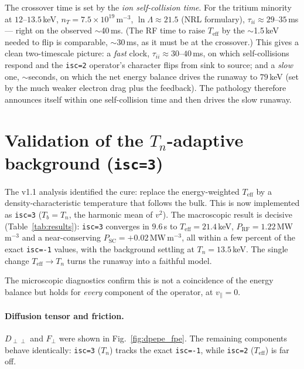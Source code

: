 \documentclass[11pt,a4paper]{article}
\begin{document}
The crossover time is set by the \emph{ion self-collision time}. For the
tritium minority at $12$--$13.5$\,keV, $n_T = 7.5\times10^{19}$\,m$^{-3}$,
$\ln\Lambda\approx21.5$ (NRL formulary),
$\tau_{ii}\approx 29$--$35$\,ms --- right on the observed $\sim$40\,ms. (The RF
time to raise $T_\text{eff}$ by the $\sim$1.5\,keV needed to flip is comparable,
$\sim$30\,ms, as it must be at the crossover.) This gives a clean two-timescale
picture: a \emph{fast} clock, $\tau_{ii}\approx 30$--$40$\,ms, on which
self-collisions respond and the \texttt{isc=2} operator's character flips from
sink to source; and a \emph{slow} one, $\sim$seconds, on which the net energy
balance drives the runaway to $79$\,keV (set by the much weaker electron drag
plus the feedback). The pathology therefore announces itself within one
self-collision time and then drives the slow runaway.

\section{Validation of the \texorpdfstring{$T_n$}{Tn}-adaptive background (\texttt{isc=3})}
\label{sec:tn}

The v1.1 analysis identified the cure: replace the energy-weighted
$T_\text{eff}$ by a density-characteristic temperature that follows the bulk.
This is now implemented as \texttt{isc=3} ($T_b = T_n$, the harmonic mean of
$v^2$). The macroscopic result is decisive (Table~\ref{tab:results}):
\texttt{isc=3} converges in $9.6$\,s to $T_\text{eff} = 21.4$\,keV,
$P_\text{RF} = 1.22$\,MW\,m$^{-3}$ and a near-conserving
$P_\text{SC} = +0.02$\,MW\,m$^{-3}$, all within a few percent of the exact
\texttt{isc=-1} values, with the background settling at $T_n = 13.5$\,keV. The
single change $T_\text{eff}\!\to\!T_n$ turns the runaway into a faithful model.

The microscopic diagnostics confirm this is not a coincidence of the energy
balance but holds for \emph{every} component of the operator, at
$v_\parallel=0$.

\paragraph{Diffusion tensor and friction.}
$D_{\perp\perp}$ and $F_\perp$ were shown in Fig.~\ref{fig:dpepe_fpe}. The
remaining components behave identically: \texttt{isc=3} ($T_n$) tracks the
exact \texttt{isc=-1}, while \texttt{isc=2} ($T_\text{eff}$) is far off.
\end{document}
